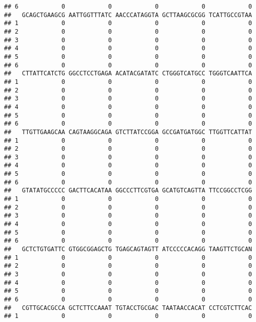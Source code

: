 \documentclass[]{article}
\begin{document}
\begin{verbatim}
## 6            0            0            0            0            0
##   GCAGCTGAAGCG AATTGGTTTATC AACCCATAGGTA GCTTAAGCGCGG TCATTGCCGTAA
## 1            0            0            0            0            0
## 2            0            0            0            0            0
## 3            0            0            0            0            0
## 4            0            0            0            0            0
## 5            0            0            0            0            0
## 6            0            0            0            0            0
##   CTTATTCATCTG GGCCTCCTGAGA ACATACGATATC CTGGGTCATGCC TGGGTCAATTCA
## 1            0            0            0            0            0
## 2            0            0            0            0            0
## 3            0            0            0            0            0
## 4            0            0            0            0            0
## 5            0            0            0            0            0
## 6            0            0            0            0            0
##   TTGTTGAAGCAA CAGTAAGGCAGA GTCTTATCCGGA GCCGATGATGGC TTGGTTCATTAT
## 1            0            0            0            0            0
## 2            0            0            0            0            0
## 3            0            0            0            0            0
## 4            0            0            0            0            0
## 5            0            0            0            0            0
## 6            0            0            0            0            0
##   GTATATGCCCCC GACTTCACATAA GGCCCTTCGTGA GCATGTCAGTTA TTCCGGCCTCGG
## 1            0            0            0            0            0
## 2            0            0            0            0            0
## 3            0            0            0            0            0
## 4            0            0            0            0            0
## 5            0            0            0            0            0
## 6            0            0            0            0            0
##   GCTCTGTGATTC GTGGCGGAGCTG TGAGCAGTAGTT ATCCCCCACAGG TAAGTTCTGCAN
## 1            0            0            0            0            0
## 2            0            0            0            0            0
## 3            0            0            0            0            0
## 4            0            0            0            0            0
## 5            0            0            0            0            0
## 6            0            0            0            0            0
##   CGTTGCACGCCA GCTCTTCCAAAT TGTACCTGCGAC TAATAACCACAT CCTCGTCTTCAC
## 1            0            0            0            0            0

\end{verbatim}
\end{document}
